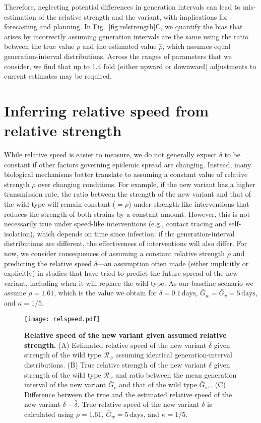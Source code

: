 \documentclass[12pt]{article}
\newcommand{\fref}[1]{Fig.~\ref{fig:#1}}
\newcommand{\RR}{\ensuremath{{\mathcal R}}\xspace}
\begin{document}
Therefore, neglecting potential differences in generation intervals can lead to mis-estimation of the relative strength and the variant, with implications for forecasting and planning.
In \fref{relstrength}C, we quantify the bias that arises by incorrectly assuming generation intervals are the same using the ratio between the true value $\rho$ and the estimated value $\hat{\rho}$, which assumes equal generation-interval distributions.
Across the ranges of parameters that we consider, we find that up to 1.4 fold (either upward or downward) adjustments to current estimates may be required.

\section{Inferring relative speed from relative strength}

While relative speed is easier to measure, we do not generally expect $\delta$ to be constant if other factors governing epidemic spread are changing.
Instead, many biological mechanisms better translate to assuming a constant value of relative strength $\rho$ over changing conditions.
For example, if the new variant has a higher transmission rate, the ratio between the strength of the new variant and that of the wild type will remain constant ($=\rho$) under strength-like interventions that reduces the strength of both strains by a constant amount.
However, this is not necessarily true under speed-like interventions (e.g., contact tracing and self-isolation), which depends on time since infection: if the generation-interval distributions are different, the effectiveness of interventions will also differ.
For now, we consider consequences of assuming a constant relative strength $\rho$ and predicting the relative speed $\delta$---an assumption often made (either implicitly or explicitly) in studies that have tried to predict the future spread of the new variant, including when it will replace the wild type.
As our baseline scenario we assume $\rho = 1.61$, which is the value we obtain for $\delta=0.1\,\textrm{days}$, $\bar{G}_w = \bar{G}_v = 5\,\textrm{days}$, and $\kappa = 1/5$.

\begin{figure}[!th]
\texttt{[image: relspeed.pdf]}
\caption{
\textbf{Relative speed of the new variant given assumed relative strength.}
(A) Estimated relative speed of the new variant $\hat{\delta}$ given strength of the wild type $\RR_w$ assuming identical generation-interval distributions.
(B) True relative strength of the new variant $\delta$ given strength of the wild type $\RR_w$ and ratio between the mean generation interval of the new variant $\bar{G}_v$ and that of the wild type $\bar{G}_w$..
(C) Difference between the true and the estimated relative speed of the new variant $\delta - \hat{\delta}$.
True relative speed of the new variant $\delta$ is calculated using $\rho=1.61$, $\bar{G}_w = 5\,\textrm{days}$, and $\kappa=1/5$.
}
\label{fig:relspeed}
\end{figure}
\end{document}
